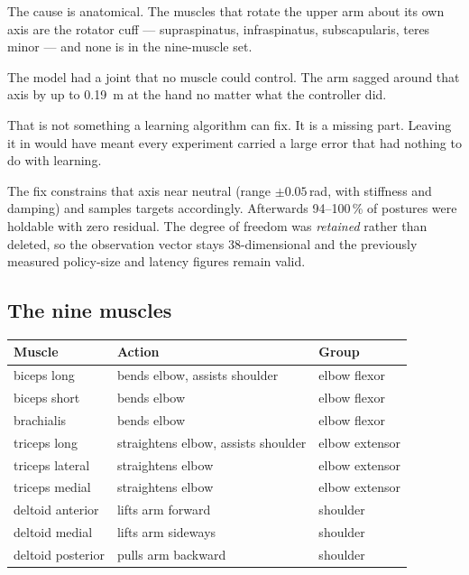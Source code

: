 The cause is anatomical. The muscles that rotate the upper arm about its own axis
are the rotator cuff --- supraspinatus, infraspinatus, subscapularis, teres minor
--- and none is in the nine-muscle set.

\begin{plain}
The model had a joint that no muscle could control. The arm sagged around that
axis by up to \SI{0.19}{\meter} at the hand no matter what the controller did.

That is not something a learning algorithm can fix. It is a missing part. Leaving
it in would have meant every experiment carried a large error that had nothing to
do with learning.
\end{plain}

The fix constrains that axis near neutral (range $\pm 0.05$\,rad, with stiffness
and damping) and samples targets accordingly. Afterwards 94--100\,\% of postures
were holdable with zero residual. The degree of freedom was \emph{retained}
rather than deleted, so the observation vector stays 38-dimensional and the
previously measured policy-size and latency figures remain valid.

\subsection{The nine muscles}

\begin{center}
\begin{tabular}{@{} L{3.4cm} L{6.4cm} L{3.4cm} @{}}
\toprule
\textbf{Muscle} & \textbf{Action} & \textbf{Group} \\
\midrule
biceps long      & bends elbow, assists shoulder & elbow flexor \\
biceps short     & bends elbow                   & elbow flexor \\
brachialis       & bends elbow                   & elbow flexor \\
triceps long     & straightens elbow, assists shoulder & elbow extensor \\
triceps lateral  & straightens elbow             & elbow extensor \\
triceps medial   & straightens elbow             & elbow extensor \\
deltoid anterior & lifts arm forward             & shoulder \\
deltoid medial   & lifts arm sideways            & shoulder \\
deltoid posterior& pulls arm backward            & shoulder \\
\bottomrule
\end{tabular}
\end{center}


